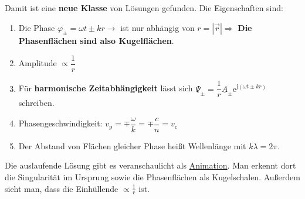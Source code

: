 		  Damit ist eine \textbf{neue Klasse} von Lösungen gefunden. Die Eigenschaften sind:
		        \begin{enumerate}
			        \item Die Phase \(\varphi_\pm = \omega t \pm kr \to \)  ist nur abhängig von \(r =|\vec{r} | \Rightarrow \) \textbf{Die Phasenflächen sind also Kugelflächen}.
			        \item Amplitude \(\propto \dfrac{1}{r}\)
			        \item Für \textbf{harmonische Zeitabhängigkeit} lässt sich  \(\underline{\Psi}_\pm = \dfrac{1}{r}\underline{A}_\pm \mathrm{e}^{\mathrm{j}(\omega t \pm kr)}\) schreiben.
			        \item Phasengeschwindigkeit: \( v_\mathrm{p} = \mp \dfrac{\omega}{k}= \mp \dfrac{c}{n} = v_\mathrm{c}\)
			        \item Der Abstand von Flächen gleicher Phase heißt Wellenlänge mit \( k \lambda = 2\pi\).
		        \end{enumerate}
		        Die auslaufende Lösung gibt es veranschaulicht als \href{https://github.com/hgkdd/TET/tree/main/programs/sherical_harmonics}{Animation}. Man erkennt dort die Singularität im Ursprung sowie die Phasenflächen als Kugelschalen. Außerdem sieht man, dass die Einhüllende \(\propto \frac{1}{r}\) ist.
